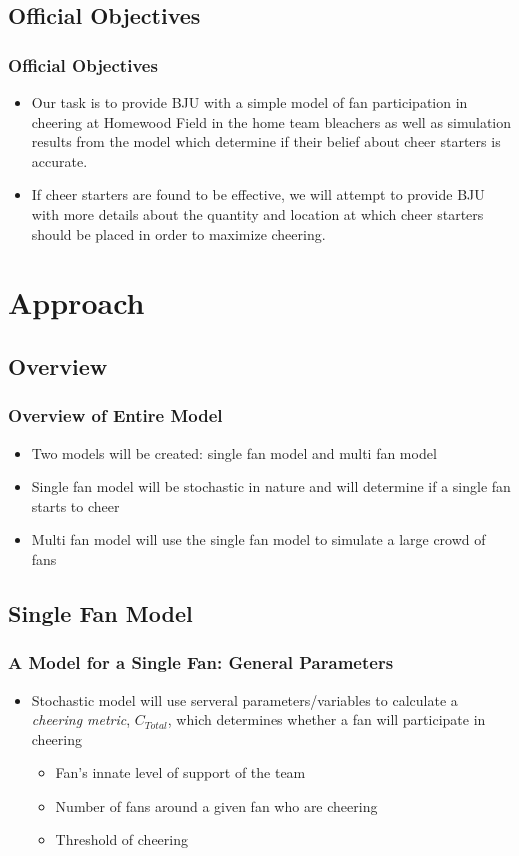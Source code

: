 \documentclass[compress,handout,10pt]{beamer}
\let\olditem\item
\renewcommand{\item}{\setlength{\itemsep}{0.5\baselineskip}\olditem}
\begin{document}
\subsection{Official Objectives}

\begin{frame}
	\frametitle {Official Objectives}
	\begin {itemize}
		\item Our task is to provide BJU with a simple model of fan participation in cheering at Homewood Field in the home team bleachers as well as simulation results from the model which determine if their belief about cheer starters is accurate. 
		\item If cheer starters are found to be effective, we will attempt to provide BJU with more details about the quantity and location at which cheer starters should be placed in order to maximize cheering.
	\end {itemize} 
\end{frame}

\section {Approach}

\subsection {Overview}

\begin {frame}
	\frametitle {Overview of Entire Model}
	\begin{itemize}
		\item Two models will be created: single fan model and multi fan model
		\item Single fan model will be stochastic in nature and will determine if a single fan starts to cheer
		\item Multi fan model will use the single fan model to simulate a large crowd of fans
	\end{itemize}
\end {frame}

\subsection{Single Fan Model}

\begin {frame}
	\frametitle {A Model for a Single Fan: General Parameters}
	\begin{itemize}
		\item Stochastic model will use serveral parameters/variables to calculate a \emph{cheering metric}, $C_{Total}$, which determines whether a fan will participate in cheering
		\begin{itemize}
			\item Fan's innate level of support of the team
			\item Number of fans around a given fan who are cheering
			\item Threshold of cheering 
		\end{itemize}
	\end {itemize}
\end {frame}
\end{document}
